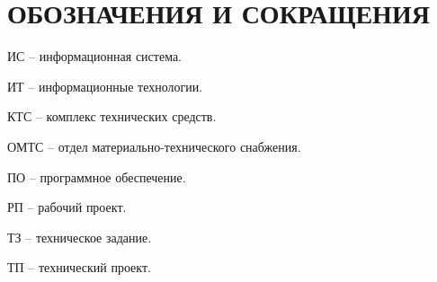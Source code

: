 \section*{ОБОЗНАЧЕНИЯ И СОКРАЩЕНИЯ}

ИС -- информационная система.

ИТ -- информационные технологии. 

КТС -- комплекс технических средств.

ОМТС -- отдел материально-технического снабжения. 

ПО -- программное обеспечение.

РП -- рабочий проект.

ТЗ -- техническое задание.

ТП -- технический проект.